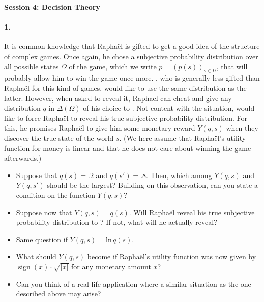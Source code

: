 \documentclass[a4paper,notitlepage,12pt]{article}
\begin{document}
\setlength{\parindent}{0pt}
\setlength{\parskip}{1ex plus 0.5ex minus 0.2ex}

\large

\textbf{Session 4: Decision Theory}


\paragraph{1. } It is common knowledge that Rapha\"el is gifted to get a good idea of the structure of complex games. Once again, he chose a subjective probability distribution over all possible states $\Omega$ of the game, which we write $p = (p(s))_{s \in \Omega}$, that will probably allow him to win the game once more. \TAtwo{}, who is generally less gifted than Rapha\"el for this kind of games, would like to use the same distribution as the latter. However, when asked to reveal it, Raphael can cheat and give any distribution $q$ in $\Delta(\Omega)$ of his choice to \TAtwo{}. Not content with the situation, \TAtwo{} would like to force Rapha\"el to reveal his true subjective probability distribution. For this, he promises Rapha\"el to give him some monetary reward $Y(q, s)$ when they discover the true state of the world $s$. (We here assume that Rapha\"el's utility function for money is linear and that he does not care about winning the game afterwards.)
\begin{itemize}
	\item Suppose that $q(s) = .2$ and $q(s') = .8$. Then, which among $Y(q,s)$ and $Y(q,s')$ should be the largest? Building on this observation, can you state a condition on the function $Y(q,s)$?
	\item Suppose now that $Y(q,s) = q(s)$. Will Rapha\"el reveal his true subjective probability distribution to \TAtwo{}? If not, what will he actually reveal?
	\item Same question if $Y(q, s) = \mathrm{ln}\,q(s)$.
	\item What should $Y(q, s)$ become if Rapha\"el's utility function was now given by $\mathop{\mathrm{sign}}(x)\cdot \sqrt{|x|}$ for any monetary amount $x$?
	\item Can you think of a real-life application where a similar situation as the one described above may arise?
\end{itemize}
\end{document}
